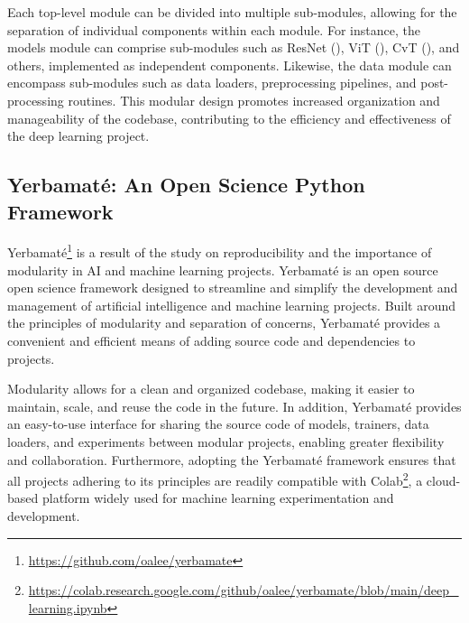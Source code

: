 \documentclass{IEEEtran}
\begin{document}
\vspace{2em}
Each top-level module can be divided into multiple sub-modules, allowing for the separation of individual components within each module. For instance, the models module can comprise sub-modules such as ResNet (\cite{resnet}), ViT (\cite{dosovitskiy2020vit}), CvT (\cite{wu2021cvt}), and others, implemented as independent components. Likewise, the data module can encompass sub-modules such as data loaders, preprocessing pipelines, and post-processing routines. This modular design promotes increased organization and manageability of the codebase, contributing to the efficiency and effectiveness of the deep learning project.


\subsection{Yerbamaté: An Open Science Python Framework}
Yerbamaté\footnote{\url{https://github.com/oalee/yerbamate}} is a result of the study on reproducibility and the importance of modularity in AI and machine learning projects. Yerbamaté is an open source open science framework designed to streamline and simplify the development and management of artificial intelligence and machine learning projects. Built around the principles of modularity and separation of concerns, Yerbamaté provides a convenient and efficient means of adding source code and dependencies to projects.

Modularity allows for a clean and organized codebase, making it easier to maintain, scale, and reuse the code in the future. In addition, Yerbamaté provides an easy-to-use interface for sharing the source code of models, trainers, data loaders, and experiments between modular projects, enabling greater flexibility and collaboration. Furthermore, adopting the Yerbamaté framework ensures that all projects adhering to its principles are readily compatible with Colab\footnote{\url{https://colab.research.google.com/github/oalee/yerbamate/blob/main/deep_learning.ipynb}}, a cloud-based platform widely used for machine learning experimentation and development.
\end{document}
